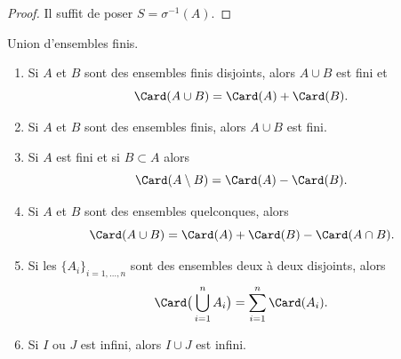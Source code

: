 \begin{proof}
	Il suffit de poser \( S=\sigma^{-1}(A)\).
\end{proof}

\begin{lemma}       \label{LEMooVFPNooVmdUXY}
	Union d'ensembles finis.
	\begin{enumerate}
		\item       \label{ITEMooBUCZooYLCuIe}
		      Si \( A\) et \( B\) sont des ensembles finis disjoints, alors \( A\cup B\) est fini et
		      \begin{equation}
			      \Card(A\cup B)=\Card(A) + \Card(B).
		      \end{equation}
		\item       \label{ITEMooCCWOooYwgGBp}
		      Si \( A\) et \( B\) sont des ensembles finis, alors \( A\cup B\) est fini.
		\item       \label{ITEMooYJSZooXQXkOX}
		      Si \( A\) est fini et si \( B\subset A\) alors
		      \begin{equation}
			      \Card(A\setminus B)=\Card(A)-\Card(B).
		      \end{equation}
		\item       \label{ITEMooSWJCooEpBVkG}
		      Si \( A\) et \( B\) sont des ensembles quelconques, alors
		      \begin{equation}
			      \Card(A\cup B)=\Card(A)+\Card(B)-\Card(A\cap B).
		      \end{equation}
		\item       \label{ITEMooJDUUooVMvAOn}
		      Si les \( \{ A_i \}_{i=1,\ldots, n}\) sont des ensembles deux à deux disjoints, alors
		      \begin{equation}
			      \Card\big( \bigcup_{i=1}^nA_i \big)=\sum_{i=1}^n\Card(A_i).
		      \end{equation}
		\item \label{ITEMooNMFSooBvsNyq}
		      Si \( I\) ou \( J\) est infini, alors \( I \cup J\) est infini.
	\end{enumerate}
\end{lemma}

